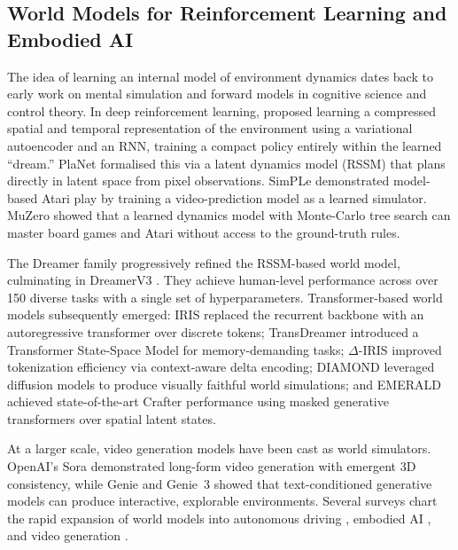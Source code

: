 \subsection{World Models for Reinforcement Learning and Embodied AI}

The idea of learning an internal model of environment dynamics dates back to early work on mental simulation and forward models in cognitive science and control theory. In deep reinforcement learning, \citet{ha2018worldmodels} proposed learning a compressed spatial and temporal representation of the environment using a variational autoencoder and an RNN, training a compact policy entirely within the learned ``dream.'' PlaNet \citep{hafner2019planet} formalised this via a latent dynamics model (RSSM) that plans directly in latent space from pixel observations. SimPLe \citep{kaiser2020simple} demonstrated model-based Atari play by training a video-prediction model as a learned simulator. MuZero \citep{schrittwieser2020muzero} showed that a learned dynamics model with Monte-Carlo tree search can master board games and Atari without access to the ground-truth rules.

The Dreamer family \citep{hafner2020dreamerv1, hafner2021dreamerv2, hafner2025dreamerv3} progressively refined the RSSM-based world model, culminating in DreamerV3 \citep{hafner2025dreamerv3}. They achieve human-level performance across over 150 diverse tasks with a single set of hyperparameters. Transformer-based world models subsequently emerged: IRIS \citep{micheli2023iris} replaced the recurrent backbone with an autoregressive transformer over discrete tokens; TransDreamer \citep{chen2022transdreamer} introduced a Transformer State-Space Model for memory-demanding tasks; $\Delta$-IRIS \citep{micheli2024deltairis} improved tokenization efficiency via context-aware delta encoding; DIAMOND \citep{alonso2024diamond} leveraged diffusion models to produce visually faithful world simulations; and EMERALD \citep{burchi2025emerald} achieved state-of-the-art Crafter performance using masked generative transformers over spatial latent states.

At a larger scale, video generation models have been cast as world simulators. OpenAI's Sora \citep{openai2024sora} demonstrated long-form video generation with emergent 3D consistency, while Genie \citep{bruce2024genie} and Genie~3 \citep{deepmind2025genie3} showed that text-conditioned generative models can produce interactive, explorable environments. Several surveys chart the rapid expansion of world models into autonomous driving \citep{wang2025wmadsurvey, wang2024wminitialsurvey}, embodied AI \citep{zhu2025embodiedwmsurvey}, and video generation \citep{cho2024sorasurvey, wang2025mechanisticvideo}.

